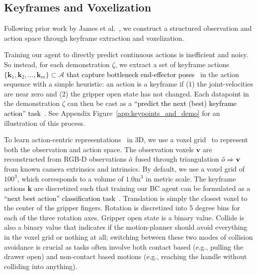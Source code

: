 \documentclass{article}
\newcommand{\appfigref}[1]{Appendix Figure~\ref{#1}}
\newcommand{\eg}{\textrm{e.g.,}\xspace}
\newcommand{\highlight}[1]{\textcolor{black}{#1}}
\begin{document}
\subsection{Keyframes and Voxelization}
\label{sec:keyframe_and_voxel}
\vspace{-0.2cm}

Following prior work by James et al.~\citep{c2farm}, we construct a  structured observation and action space through keyframe extraction and voxelization.

Training our agent to directly predict continuous actions is inefficient and noisy. So instead, for each demonstration $\zeta$, we extract a set of keyframe actions $\{\mathbf{k}_{1}, \mathbf{k}_{2}, \ldots, \mathbf{k}_{m}\} \subset \mathcal{A}$ \highlight{that capture bottleneck end-effector poses}~\citep{johns2021coarse} in the action sequence with a simple heuristic: an action is a keyframe if (1) the joint-velocities are near zero and (2) the gripper open state has not changed. 
Each datapoint in the demonstration $\zeta$ can then be cast as a \highlight{``predict the next (best) keyframe action'' task~\citep{c2farm,armpaper,liu2022auto_lambda}}. See \appfigref{app:keypoints_and_demo} for an illustration of this process. 



To learn action-centric representations~\cite{gibson2014ecological} in 3D, we use a voxel grid~\citep{moravec1996robot,30724} to represent both the observation and action space. The observation voxels $\mathbf{v}$ are reconstructed from RGB-D observations $\Tilde{o}$ fused through triangulation $\Tilde{o} \Rightarrow \mathbf{v}$ from known camera extrinsics and intrinsics. By default, we use a voxel grid of $100^3$, which corresponds to a volume of $1.0\textrm{m}^3$ in metric scale. The keyframe actions $\mathbf{k}$ are discretized such that training our BC agent can be formulated as a \highlight{``next best action'' classification task~\citep{c2farm}}.
Translation is simply the closest voxel to the center of the gripper fingers. Rotation is discretized into 5 degree bins for each of the three rotation axes. Gripper open state is a binary value. Collide is also a binary value that indicates if the motion-planner should avoid everything in the voxel grid or nothing at all; switching between these two modes of collision avoidance is crucial as tasks often involve both contact based (\eg pulling the drawer open) and non-contact based motions (\eg reaching the handle without colliding into anything). 
\vspace{-0.2cm}
\end{document}
